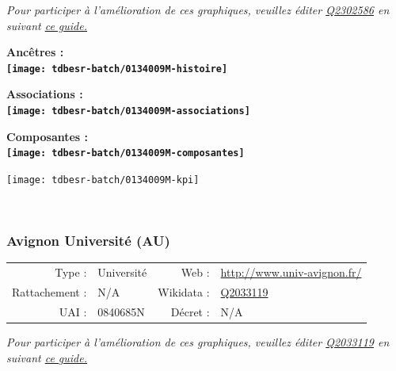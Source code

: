 \documentclass[12pt,french,]{article}
\begin{document}
\textit{\scriptsize Pour participer à l'amélioration de ces graphiques, veuillez éditer  \href{https://www.wikidata.org/entity/Q2302586}{Q2302586}  en suivant \href{https://github.com/cpesr/wikidataESR/blob/master/Rmd/wikidataESR.md}{ce guide.}}

\vspace{1cm}  
\begin{minipage}[b]{0.50\textwidth}\begin{center} \bf Ancêtres : \\  
\texttt{[image: tdbesr-batch/0134009M-histoire]} \end{center}\end{minipage}\begin{minipage}[b]{0.50\textwidth}\begin{center} \bf Associations : \\  
\texttt{[image: tdbesr-batch/0134009M-associations]} \end{center}\end{minipage}

\hrulefill

\begin{center} \bf Composantes : \\  
\texttt{[image: tdbesr-batch/0134009M-composantes]} \end{center}

\begin{center}\texttt{[image: tdbesr-batch/0134009M-kpi]} \end{center}\checkoddpage

\ifoddpage ~\newpage \fi   

\hypertarget{avignon-universituxe9-au}{%
\subsubsection{Avignon Université (AU)}\label{avignon-universituxe9-au}}

\begin{tabular*}{\textwidth}{rp{5cm}rl}  
\hline  
Type : & Université & Web : &\href{http://www.univ-avignon.fr/}{http://www.univ-avignon.fr/} \\  
Rattachement : & N/A & Wikidata : & \href{https://www.wikidata.org/entity/Q2033119}{Q2033119} \\  
UAI : & 0840685N & Décret : & N/A \\  
\hline  
\end{tabular*}

\textit{\scriptsize Pour participer à l'amélioration de ces graphiques, veuillez éditer  \href{https://www.wikidata.org/entity/Q2033119}{Q2033119}  en suivant \href{https://github.com/cpesr/wikidataESR/blob/master/Rmd/wikidataESR.md}{ce guide.}}
\end{document}
